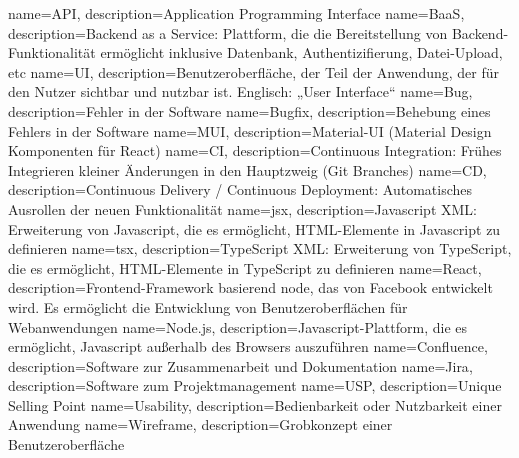 {
    name={API},
    description={Application Programming Interface}
}
{
    name={BaaS},
    description={Backend as a Service: Plattform, die die Bereitstellung von Backend-Funktionalität ermöglicht inklusive Datenbank, Authentizifierung, Datei-Upload, etc}
}
{
    name={UI},
    description={Benutzeroberfläche, der Teil der Anwendung, der für den Nutzer sichtbar und nutzbar ist. Englisch: „User Interface“}
}
{
    name={Bug},
    description={Fehler in der Software}
}
{
    name={Bugfix},
    description={Behebung eines Fehlers in der Software}
}
{
    name={MUI},
    description={Material-UI (Material Design Komponenten für React)}
}
{
    name={CI},
    description={Continuous Integration: Frühes Integrieren kleiner Änderungen in den Hauptzweig (Git Branches)}
}
{
    name={CD},
    description={Continuous Delivery / Continuous Deployment: Automatisches Ausrollen der neuen Funktionalität}
}
{
    name={jsx},
    description={Javascript XML: Erweiterung von Javascript, die es ermöglicht, HTML-Elemente in Javascript zu definieren}
}
{
    name={tsx},
    description={TypeScript XML: Erweiterung von TypeScript, die es ermöglicht, HTML-Elemente in TypeScript zu definieren}
}
{
    name={React},
    description={Frontend-Framework basierend \gls{node}, das von Facebook entwickelt wird. Es ermöglicht die Entwicklung von Benutzeroberflächen für Webanwendungen}
}
{
    name={Node.js},
    description={Javascript-Plattform, die es ermöglicht, Javascript außerhalb des Browsers auszuführen}
}
{
    name={Confluence},
    description={Software zur Zusammenarbeit und Dokumentation}
}
{
    name={Jira},
    description={Software zum Projektmanagement}
}
{
    name={USP},
    description={Unique Selling Point}
}
{
    name={Usability},
    description={Bedienbarkeit oder Nutzbarkeit einer Anwendung}
}
{
    name={Wireframe},
    description={Grobkonzept einer Benutzeroberfläche}
}


\glsaddall

